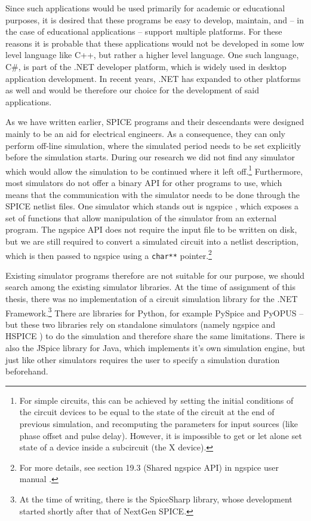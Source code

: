Since such applications would be used primarily for academic or educational purposes, it is desired that these programs be easy to develop, maintain, and -- in the case of educational applications -- support multiple platforms. For these reasons it is probable that these applications would not be developed in some low level language like C++, but rather a higher level language. One such language, C\#, is part of the .NET developer platform, which is widely used in desktop application development. In recent years, .NET has expanded to other platforms as well and would be therefore our choice for the development of said applications.

As we have written earlier, SPICE programs and their descendants were designed mainly to be an aid for electrical engineers. As a consequence, they can only perform off-line simulation, where the simulated period needs to be set explicitly before the simulation starts. During our research we did not find any simulator which would allow the simulation to be continued where it left off.\footnote{For simple circuits, this can be achieved by setting the initial conditions of the circuit devices to be equal to the state of the circuit at the end of previous simulation, and recomputing the parameters for input sources (like phase offset and pulse delay). However, it is impossible to get or let alone set state of a device inside a subcircuit (the X device).} Furthermore, most simulators do not offer a binary API for other programs to use, which means that the communication with the simulator needs to be done through the SPICE netlist files. One simulator which stands out is ngspice \cite{ngspice}, which exposes a set of functions that allow manipulation of the simulator from an external program. The ngspice API does not require the input file to be written on disk, but we are still required to convert a simulated circuit into a netlist description, which is then passed to ngspice using a \texttt{char**} pointer.\footnote{For more details, see section 19.3 (Shared ngspice API) in ngspice user manual \cite{ngspice-manual}.}

Existing simulator programs therefore are not suitable for our purpose, we should search among the existing simulator libraries. At the time of assignment of this thesis, there was no implementation of a circuit simulation library for the .NET Framework.\footnote{At the time of writing, there is the SpiceSharp \cite{spicesharp} library, whose development started shortly after that of NextGen SPICE.} There are libraries for Python, for example PySpice \cite{pyspice} and PyOPUS \cite{pyopus} -- but these two libraries rely on standalone simulators (namely ngspice \cite{ngspice} and HSPICE \cite{hspice}) to do the simulation and therefore share the same limitations. There is also the JSpice \cite{jspice} library for Java, which implements it's own simulation engine, but just like other simulators requires the user to specify a simulation duration beforehand.

